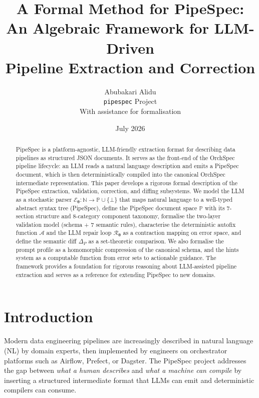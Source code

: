 \documentclass[11pt,a4paper]{article}
\title{A Formal Method for PipeSpec:\\An Algebraic Framework for LLM-Driven\\Pipeline Extraction and Correction}
\author{Abubakari Alidu\\
\texttt{pipespec} Project\\
\small With assistance for formalisation}
\date{July 2026}
\theoremstyle{definition}
\begin{document}
\maketitle

\begin{abstract}
PipeSpec is a platform-agnostic, LLM-friendly extraction format for describing data pipelines as structured JSON documents. It serves as the front-end of the OrchSpec pipeline lifecycle: an LLM reads a natural language description and emits a PipeSpec document, which is then deterministically compiled into the canonical OrchSpec intermediate representation. This paper develops a rigorous formal description of the PipeSpec extraction, validation, correction, and diffing subsystems. We model the LLM as a stochastic parser $\mathcal{E}_{\bm\theta} : \mathbb{N} \to \mathbb{P} \cup \{\bot\}$ that maps natural language to a well-typed abstract syntax tree (PipeSpec), define the PipeSpec document space $\mathbb{P}$ with its 7-section structure and 8-category component taxonomy, formalise the two-layer validation model (schema + 7 semantic rules), characterise the deterministic autofix function $\mathcal{A}$ and the LLM repair loop $\mathcal{R}_{\bm\theta}$ as a contraction mapping on error space, and define the semantic diff $\Delta_P$ as a set-theoretic comparison. We also formalise the prompt profile as a homomorphic compression of the canonical schema, and the hints system as a computable function from error sets to actionable guidance. The framework provides a foundation for rigorous reasoning about LLM-assisted pipeline extraction and serves as a reference for extending PipeSpec to new domains.
\end{abstract}

\tableofcontents

\section{Introduction}

Modern data engineering pipelines are increasingly described in natural language (NL) by domain experts, then implemented by engineers on orchestrator platforms such as Airflow, Prefect, or Dagster. The PipeSpec project addresses the gap between \emph{what a human describes} and \emph{what a machine can compile} by inserting a structured intermediate format that LLMs can emit and deterministic compilers can consume.
\end{document}
